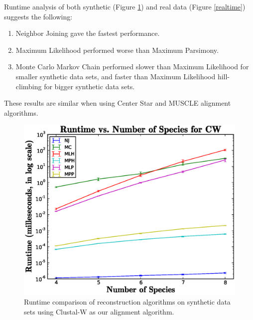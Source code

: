 \documentclass[10pt,twocolumn]{article}
\begin{document}
Runtime analysis of both synthetic (Figure \ref{synthetictime}) and real data (Figure \ref{realtime}) suggests the following:
\begin{enumerate}
\item Neighbor Joining gave the fastest performance.
\item Maximum Likelihood performed worse than Maximum Parsimony.
\item Monte Carlo Markov Chain performed slower than Maximum Likelihood for smaller synthetic data sets, and faster than Maximum Likelihood hill-climbing for bigger synthetic data sets.
\end{enumerate}
These results are similar when using Center Star and MUSCLE alignment algorithms.
\begin{figure}[ht!]
\begin{centering}
  \includegraphics[scale=.45]{media/runtimeGraphs/CW.eps}
  \caption{Runtime comparison of reconstruction algorithms on synthetic data sets using Clustal-W as our alignment algorithm.}
  \label{synthetictime}
\end{centering}
\end{figure}
\end{document}
